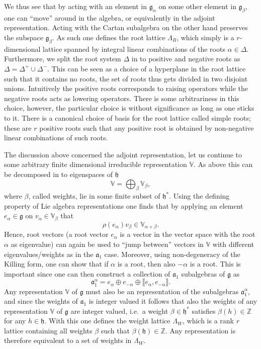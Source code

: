 We thus see that by acting with an element in $\mathfrak{g}_\alpha$ on some other element in $\mathfrak{g}_\beta$, one can ``move'' around in the algebra, or equivalently in the adjoint representation. Acting with the Cartan subalgebra on the other hand preserves the subspace $\mathfrak{g}_\beta$. As such one defines the root lattice $\Lambda_R$, which simply is a $r$-dimensional lattice spanned by integral linear combinations of the roots $\alpha\in\Delta$. Furthermore, we split the root system $\Delta$ in to positive and negative roots as $\Delta = \Delta^+\cup\Delta^-$. This can be seen as a choice of a hyperplane in the root lattice such that it contains no roots, the set of roots thus gets divided in two disjoint unions. Intuitively the positive roots corresponds to raising operators while the negative roots acts as lowering operators. There is some arbitrariness in this choice, however, the particular choice is without significance as long as one sticks to it. There is a canonical choice of basis for the root lattice called simple roots; these are $r$ positive roots such that any positive root is obtained by non-negative linear combinations of such roots. 

The discussion above concerned the adjoint representation, let us continue to some arbitrary finite dimensional irreducible representation $\mathbb{V}$. As above this can be decomposed in to eigenspaces of $\mathfrak{h}$
\begin{equation}
    \mathbb{V} = \bigoplus_\beta \mathbb{V}_\beta,
\end{equation}
where $\beta$, called weights, lie in some finite subset of $\mathfrak{h}^*$. Using the defining property of Lie algebra representations one finds that by applying an element $e_\alpha\in\mathfrak{g}$ on $v_\alpha\in\mathbb{V}_\beta$ that 
\begin{equation}
    \rho(e_\alpha)v_\beta \in \mathbb{V}_{\alpha+\beta}.
\end{equation}
Hence, root vectors (a root vector $e_\alpha$ is a vector in the vector space with the root $\alpha$ as eigenvalue) can again be used to ``jump between'' vectors in $\mathbb{V}$ with different eigenvalues/weights as in the $\mathfrak{a}_1$ case. Moreover, using non-degeneracy of the Killing form, one can show that if $\alpha$ is a root, then also $-\alpha$ is a root. This is important since one can then construct a collection of $\mathfrak{a}_1$ subalgebras of $\mathfrak{g}$ as 
\begin{equation}
    \mathfrak{a}_1^\alpha = e_\alpha \oplus e_{-\alpha} \oplus \llbracket e_\alpha,e_{-\alpha}\rrbracket.
\end{equation}
Any representation $\mathbb{V}$ of $\mathfrak{g}$ must also be an representation of the subalgebras $\mathfrak{a}_1^\alpha$, and since the weights of $\mathfrak{a}_1$ is integer valued it follows that also the weights of any representation $\mathbb{V}$ of $\mathfrak{g}$ are integer valued, i.e.\ a weight $\beta\in\mathfrak{h}^*$ satisfies $\beta(h)\in\mathbb{Z}$ for any $h\in\mathfrak{h}$. With this one defines the weight lattice $\Lambda_W$, which is a rank $r$ lattice containing all weights $\beta$ such that $\beta(\mathfrak{h})\in\mathbb{Z}$. Any representation is therefore equivalent to a set of weights in $\Lambda_W$. 

